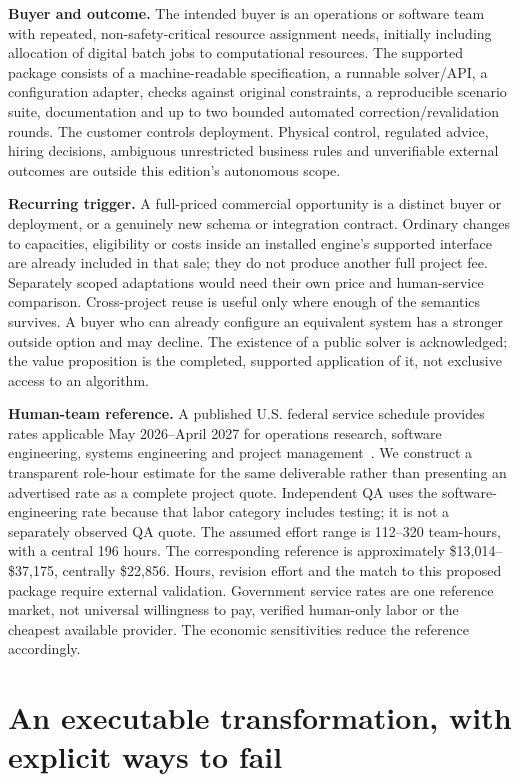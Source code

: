\documentclass[11pt,letterpaper]{article}
\newcommand{\usd}[1]{\$#1}
\begin{document}
\textbf{Buyer and outcome.} The intended buyer is an operations or software team with repeated, non-safety-critical resource assignment needs, initially including allocation of digital batch jobs to computational resources. The supported package consists of a machine-readable specification, a runnable solver/API, a configuration adapter, checks against original constraints, a reproducible scenario suite, documentation and up to two bounded automated correction/revalidation rounds. The customer controls deployment. Physical control, regulated advice, hiring decisions, ambiguous unrestricted business rules and unverifiable external outcomes are outside this edition's autonomous scope.

\textbf{Recurring trigger.} A full-priced commercial opportunity is a distinct buyer or deployment, or a genuinely new schema or integration contract. Ordinary changes to capacities, eligibility or costs inside an installed engine's supported interface are already included in that sale; they do not produce another full project fee. Separately scoped adaptations would need their own price and human-service comparison. Cross-project reuse is useful only where enough of the semantics survives. A buyer who can already configure an equivalent system has a stronger outside option and may decline. The existence of a public solver is acknowledged; the value proposition is the completed, supported application of it, not exclusive access to an algorithm.

\textbf{Human-team reference.} A published U.S. federal service schedule provides rates applicable May 2026--April 2027 for operations research, software engineering, systems engineering and project management~\cite{GSA}. We construct a transparent role-hour estimate for the same deliverable rather than presenting an advertised rate as a complete project quote. Independent QA uses the software-engineering rate because that labor category includes testing; it is not a separately observed QA quote. The assumed effort range is 112--320 team-hours, with a central 196 hours. The corresponding reference is approximately \usd{13,014}--\usd{37,175}, centrally \usd{22,856}. Hours, revision effort and the match to this proposed package require external validation. Government service rates are one reference market, not universal willingness to pay, verified human-only labor or the cheapest available provider. The economic sensitivities reduce the reference accordingly.

\section{An executable transformation, with explicit ways to fail}
\end{document}

